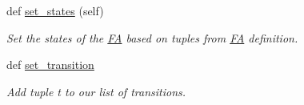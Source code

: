 \begin{DoxyCompactItemize}
def \mbox{\hyperlink{classfinite__automaton_1_1_f_a_aaa9f224b31953da5ada0db6c434f05db}{set\+\_\+states}} (self)
\begin{DoxyCompactList}\small\item\em Set the states of the \mbox{\hyperlink{classfinite__automaton_1_1_f_a}{FA}} based on tuples from \mbox{\hyperlink{classfinite__automaton_1_1_f_a}{FA}} definition. \end{DoxyCompactList}\item 
def \mbox{\hyperlink{classfinite__automaton_1_1_f_a_a37e36ca6721cd99add8b761f89635496}{set\+\_\+transition}}
\begin{DoxyCompactList}\small\item\em Add tuple t to our list of transitions. \end{DoxyCompactList}\end{DoxyCompactItemize}
